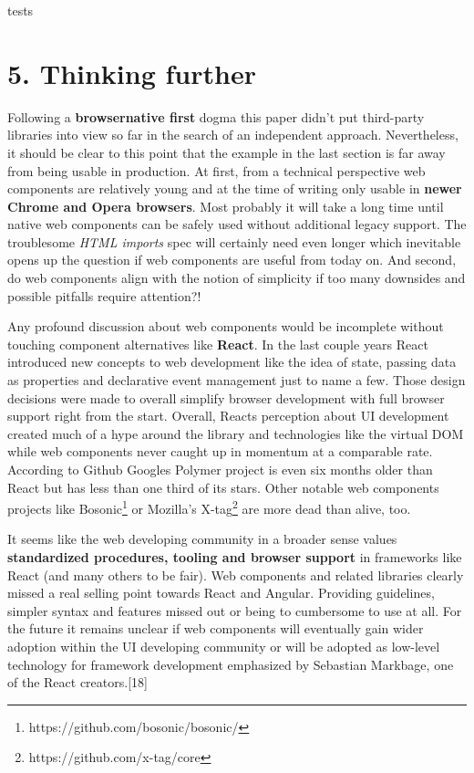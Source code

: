 \documentclass[]{article}
\begin{document}
tests

\section{5. Thinking further}\label{thinking-further}

Following a \textbf{browsernative first} dogma this paper didn't put
third-party libraries into view so far in the search of an independent
approach. Nevertheless, it should be clear to this point that the
example in the last section is far away from being usable in production.
At first, from a technical perspective web components are relatively
young and at the time of writing only usable in \textbf{newer Chrome and
Opera browsers}. Most probably it will take a long time until native web
components can be safely used without additional legacy support. The
troublesome \emph{HTML imports} spec will certainly need even longer
which inevitable opens up the question if web components are useful from
today on. And second, do web components align with the notion of
simplicity if too many downsides and possible pitfalls require
attention?!

Any profound discussion about web components would be incomplete without
touching component alternatives like \textbf{React}. In the last couple
years React introduced new concepts to web development like the idea of
state, passing data as properties and declarative event management just
to name a few. Those design decisions were made to overall simplify
browser development with full browser support right from the start.
Overall, Reacts perception about UI development created much of a hype
around the library and technologies like the virtual DOM while web
components never caught up in momentum at a comparable rate. According
to Github Googles Polymer project is even six months older than React
but has less than one third of its stars. Other notable web components
projects like Bosonic\footnote{https://github.com/bosonic/bosonic/} or
Mozilla's X-tag\footnote{https://github.com/x-tag/core} are more dead
than alive, too.

It seems like the web developing community in a broader sense values
\textbf{standardized procedures, tooling and browser support} in
frameworks like React (and many others to be fair). Web components and
related libraries clearly missed a real selling point towards React and
Angular. Providing guidelines, simpler syntax and features missed out or
being to cumbersome to use at all. For the future it remains unclear if
web components will eventually gain wider adoption within the UI
developing community or will be adopted as low-level technology for
framework development emphasized by Sebastian Markbage, one of the React
creators.{[}18{]}
\end{document}
